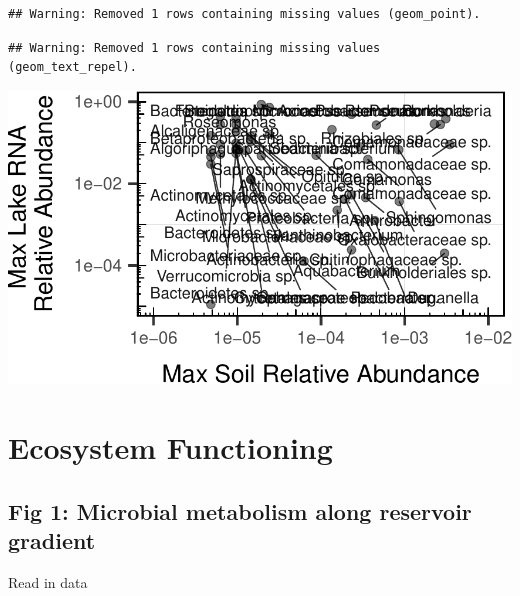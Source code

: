 \documentclass[]{article}
\begin{document}
\begin{verbatim}
## Warning: Removed 1 rows containing missing values (geom_point).
\end{verbatim}

\begin{verbatim}
## Warning: Removed 1 rows containing missing values (geom_text_repel).
\end{verbatim}

\begin{center}\includegraphics[width=0.7\linewidth]{ReservoirGradient_files/figure-latex/soil_lake_plot-1} \end{center}

\section{Ecosystem Functioning}\label{ecosystem-functioning}

\subsection{Fig 1: Microbial metabolism along reservoir
gradient}\label{fig-1-microbial-metabolism-along-reservoir-gradient}

Read in data
\end{document}
